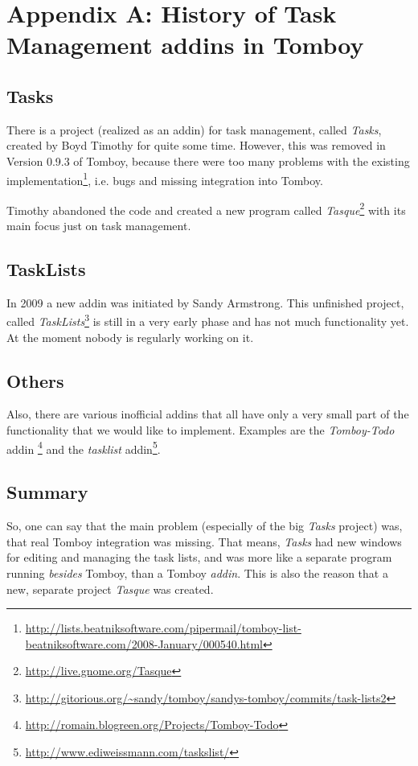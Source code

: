 \clearpage
\appendix
\section{Appendix A: History of Task Management addins in Tomboy}

\label{appendix:history}
\subsection{Tasks}
There is a project (realized as an addin) for task management, called \textit{Tasks}, created by Boyd Timothy for quite some time. However, this was removed in Version 0.9.3 of Tomboy, because there were too many problems with the existing implementation\footnote{\url{http://lists.beatniksoftware.com/pipermail/tomboy-list-beatniksoftware.com/2008-January/000540.html}}, i.e. bugs and missing integration into Tomboy.

Timothy abandoned the code and created a new program called \textit{Tasque}\footnote{\url{http://live.gnome.org/Tasque}} with its main focus just on task management.

\subsection{TaskLists}
In 2009 a new addin was initiated by Sandy Armstrong. This unfinished project, called \textit{TaskLists}\footnote{\url{http://gitorious.org/~sandy/tomboy/sandys-tomboy/commits/task-lists2}} is still in a very early phase and has not much functionality yet. At the moment nobody is regularly working on it.

\subsection{Others}
Also, there are various inofficial addins that all have only a very small part of the functionality that we would like to implement. Examples are the \textit{Tomboy-Todo} addin \footnote{\url{http://romain.blogreen.org/Projects/Tomboy-Todo}} and the \textit{tasklist} addin\footnote{\url{http://www.ediweissmann.com/taskslist/}}.

\subsection{Summary}
\label{lessons}
So, one can say that the main problem (especially of the big \textit{Tasks} project) was, that real Tomboy integration was missing. That means, \textit{Tasks} had new windows for editing and managing the task lists, and was more like a separate program running \textit{besides} Tomboy, than a Tomboy \textit{addin}. This is also the reason that a new, separate project \textit{Tasque} was created.
